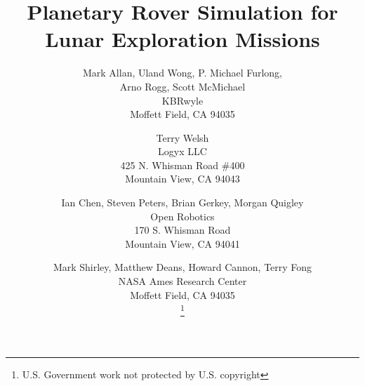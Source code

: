 \documentclass[twocolumn,letterpaper]{IEEEAerospaceCLS}  %
\begin{document}
\title{Planetary Rover Simulation for Lunar Exploration Missions}

\author{
Mark Allan, Uland Wong, P.  Michael Furlong, \\
Arno Rogg, Scott McMichael\\ 
KBRwyle \\
Moffett Field, CA 94035 \\
\and 
Terry Welsh \\
Logyx LLC \\
425 N.  Whisman Road \#400 \\
Mountain View, CA 94043 \\
\and 
Ian Chen, Steven Peters, Brian Gerkey, Morgan Quigley \\
Open Robotics \\
170 S.  Whisman Road \\
Mountain View, CA 94041 \\
\and
Mark Shirley, Matthew Deans, Howard Cannon, Terry Fong \\
NASA Ames Research Center \\
Moffett Field, CA 94035 \\
\thanks{{U.S.  Government work not protected by U.S.  copyright}}         %
}

\maketitle

\thispagestyle{plain}
\pagestyle{plain}

\maketitle

\thispagestyle{plain}
\pagestyle{plain}
\end{document}
